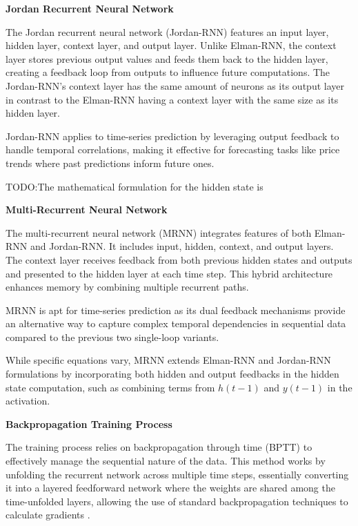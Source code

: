 \documentclass[conference, 10pt]{IEEEtran}
\begin{document}

\textbf{Jordan Recurrent Neural Network }

The Jordan recurrent neural network (Jordan-RNN) features an input layer, hidden layer, context layer, and output layer. Unlike
Elman-RNN, the context layer stores previous output values and feeds them back to the hidden layer, creating a feedback
loop from outputs to influence future computations. The Jordan-RNN's context layer has the same amount of
neurons as its output layer in contrast to the Elman-RNN having a context layer with the same size as its hidden layer.

Jordan-RNN applies to time-series prediction by leveraging output feedback to handle temporal correlations, making it effective
for forecasting tasks like price trends where past predictions inform future ones.

TODO:The mathematical formulation for the hidden state is 

\textbf{Multi-Recurrent Neural Network }

The multi-recurrent neural network (MRNN) integrates features of both Elman-RNN and Jordan-RNN. It includes input,
hidden, context, and output layers. The context layer receives feedback from both previous hidden states and
outputs and presented to the hidden layer at each time step. This hybrid architecture enhances memory by combining multiple
recurrent paths.

MRNN is apt for time-series prediction as its dual feedback mechanisms provide an alternative way to capture complex
temporal dependencies in sequential data compared to the previous two single-loop variants.

While specific equations vary, MRNN extends Elman-RNN and Jordan-RNN formulations by incorporating both hidden and output feedbacks
in the hidden state computation, such as combining terms from \( h(t-1) \) and \( y(t-1) \) in the activation.

\textbf{Backpropagation Training Process} 

The training process relies on backpropagation through time (BPTT) to effectively manage the sequential nature of the
data. This method works by unfolding the recurrent network across multiple time steps, essentially converting it into a
layered feedforward network where the weights are shared among the time-unfolded layers, allowing the use of standard
backpropagation techniques to calculate gradients \cite{quarkmlBackpropagationThrough}.
\end{document}

